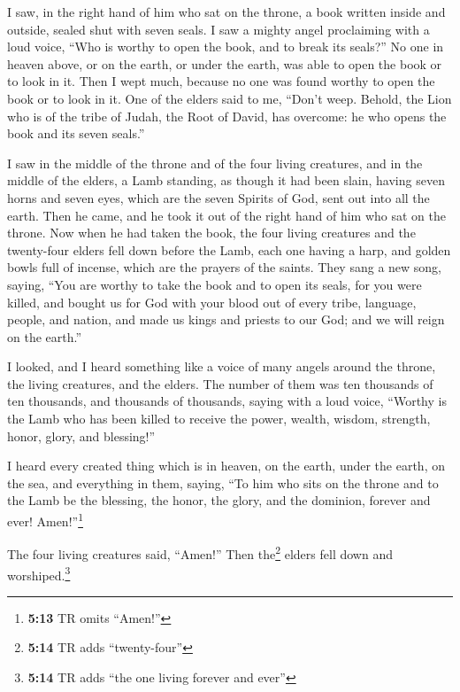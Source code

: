  I saw, in the right hand of him who sat on the throne, a
book written inside and outside, sealed shut with seven seals.
 I saw a mighty angel proclaiming with a loud voice, ``Who
is worthy to open the book, and to break its seals?''  No
one in heaven above, or on the earth, or under the earth, was able to
open the book or to look in it.  Then I wept much, because
no one was found worthy to open the book or to look in it.
 One of the elders said to me, ``Don't weep. Behold, the
Lion who is of the tribe of Judah, the Root of David, has overcome: he
who opens the book and its seven seals.''

 I saw in the middle of the throne and of the four living
creatures, and in the middle of the elders, a Lamb standing, as though
it had been slain, having seven horns and seven eyes, which are the
seven Spirits of God, sent out into all the earth.  Then
he came, and he took it out of the right hand of him who sat on the
throne.  Now when he had taken the book, the four living
creatures and the twenty-four elders fell down before the Lamb, each one
having a harp, and golden bowls full of incense, which are the prayers
of the saints.  They sang a new song, saying, ``You are
worthy to take the book and to open its seals, for you were killed, and
bought us for God with your blood out of every tribe, language, people,
and nation,  and made us kings and priests to our God;
and we will reign on the earth.''

 I looked, and I heard something like a voice of many
angels around the throne, the living creatures, and the elders. The
number of them was ten thousands of ten thousands, and thousands of
thousands,  saying with a loud voice, ``Worthy is the
Lamb who has been killed to receive the power, wealth, wisdom, strength,
honor, glory, and blessing!''

 I heard every created thing which is in heaven, on the
earth, under the earth, on the sea, and everything in them, saying, ``To
him who sits on the throne and to the Lamb be the blessing, the honor,
the glory, and the dominion, forever and ever! Amen!''\footnote{\textbf{5:13}
  TR omits ``Amen!''}

 The four living creatures said, ``Amen!'' Then
the\footnote{\textbf{5:14} TR adds ``twenty-four''} elders fell down and
worshiped.\footnote{\textbf{5:14} TR adds ``the one living forever and
  ever''}

